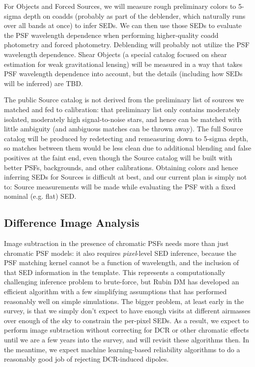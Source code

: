 \documentclass[DM,authoryear,toc]{lsstdoc}
\begin{document}
For Objects and Forced Sources, we will measure rough preliminary colors to 5-sigma depth on coadds (probably as part of the deblender, which naturally runs over all bands at once) to infer SEDs.
We can then use those SEDs to evaluate the PSF wavelength dependence when performing higher-quality coadd photometry and forced photometry.
Deblending will probably not utilize the PSF wavelength dependence.
Shear Objects (a special catalog focused on shear estimation for weak gravitational lensing) will be measured in a way that takes PSF wavelength dependence into account, but the details (including how SEDs will be inferred) are TBD.

The public Source catalog is not derived from the preliminary list of sources we matched and fed to calibration: that preliminary list only contains moderately isolated, moderately high signal-to-noise stars, and hence can be matched with little ambiguity (and ambiguous matches can be thrown away).
The full Source catalog will be produced by redetecting and remeasuring down to 5-sigma depth, so matches between them would be less clean due to additional blending and false positives at the faint end, even though the Source catalog will be built with better PSFs, backgrounds, and other calibrations.
Obtaining colors and hence inferring SEDs for Sources is difficult at best, and our current plan is simply not to: Source measurements will be made while evaluating the PSF with a fixed nominal (e.g. flat) SED.

\subsection{Difference Image Analysis}


Image subtraction in the presence of chromatic PSFs needs more than just chromatic PSF models: it also requires \emph{pixel}-level SED inference, because the PSF matching kernel cannot be a function of wavelength, and the inclusion of that SED information in the template.
This represents a computationally challenging inference problem to brute-force, but Rubin DM has developed an efficient algorithm with a few simplifying assumptions \citep{DMTN-037, DMTN-121} that has performed reasonably well on simple simulations.
The bigger problem, at least early in the survey, is that we simply don't expect to have enough visits at different airmasses over enough of the sky to constrain the per-pixel SEDs.
As a result, we expect to perform image subtraction without correcting for DCR or other chromatic effects until we are a few years into the survey, and will revisit these algorithms then.
In the meantime, we expect machine learning-based reliability algorithms to do a reasonably good job of rejecting DCR-induced dipoles.
\end{document}
